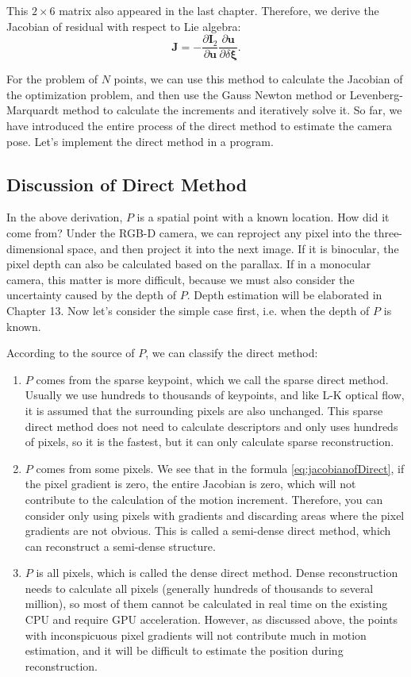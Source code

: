 This $2 \times 6$ matrix also appeared in the last chapter. Therefore, we derive the Jacobian of residual with respect to Lie algebra:
\begin{equation}
\label{eq:jacobianofDirect}
\mathbf{J} =  - \frac{{\partial { \mathbf{I}_2}}}{{\partial \mathbf{u}}}\frac{{\partial \mathbf{u}}}{{\partial \delta \mathbf{\xi} }}.
\end{equation}

For the problem of $N$ points, we can use this method to calculate the Jacobian of the optimization problem, and then use the Gauss Newton method or Levenberg-Marquardt method to calculate the increments and iteratively solve it. So far, we have introduced the entire process of the direct method to estimate the camera pose. Let's implement the direct method in a program.

\subsection{Discussion of Direct Method}
In the above derivation, $P$ is a spatial point with a known location. How did it come from? Under the RGB-D camera, we can reproject any pixel into the three-dimensional space, and then project it into the next image. If it is binocular, the pixel depth can also be calculated based on the parallax. If in a monocular camera, this matter is more difficult, because we must also consider the uncertainty caused by the depth of $P$. Depth estimation will be elaborated in Chapter 13. Now let's consider the simple case first, i.e. when the depth of $P$ is known.

According to the source of $P$, we can classify the direct method:
\begin{enumerate}
	\item $P$ comes from the sparse keypoint, which we call the sparse direct method. Usually we use hundreds to thousands of keypoints, and like L-K optical flow, it is assumed that the surrounding pixels are also unchanged. This sparse direct method does not need to calculate descriptors and only uses hundreds of pixels, so it is the fastest, but it can only calculate sparse reconstruction.
	\item $P$ comes from some pixels. We see that in the formula \eqref{eq:jacobianofDirect}, if the pixel gradient is zero, the entire Jacobian is ​​zero, which will not contribute to the calculation of the motion increment. Therefore, you can consider only using pixels with gradients and discarding areas where the pixel gradients are not obvious. This is called a semi-dense direct method, which can reconstruct a semi-dense structure.
	\item $P$ is all pixels, which is called the dense direct method. Dense reconstruction needs to calculate all pixels (generally hundreds of thousands to several million), so most of them cannot be calculated in real time on the existing CPU and require GPU acceleration. However, as discussed above, the points with inconspicuous pixel gradients will not contribute much in motion estimation, and it will be difficult to estimate the position during reconstruction.
\end{enumerate}

